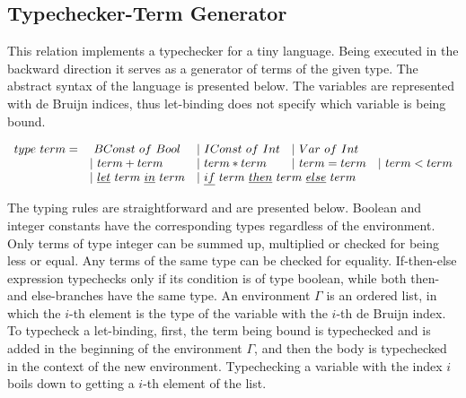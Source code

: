 
\subsection{Typechecker-Term Generator}

This relation implements a typechecker for a tiny language.
Being executed in the backward direction it serves as a generator of terms of the given type.
The abstract syntax of the language is presented below.
The variables are represented with de Bruijn indices, thus let-binding does not specify which variable is being bound.



\[\begin{array}{lllll}
  type \ term = &\ BConst \ of \ Bool &| \ IConst \ of \ Int &| \ Var \ of \ Int & \\
  & | \ term + term &| \ term * term &| \ term = term &| \ term < term \\
  &| \ \underline{let} \ term \ \underline{in} \ term
  &\multicolumn{2}{l}{| \ \underline{if} \ term \ \underline{then} \ term \ \underline{else} \ term} &
\end{array}\]

The typing rules are straightforward and are presented below.
Boolean and integer constants have the corresponding types regardless of the environment.
Only terms of type integer can be summed up, multiplied or checked for being less or equal.
Any terms of the same type can be checked for equality.
If-then-else expression typechecks only if its condition is of type boolean, while both then- and else-branches have the same type.
An environment $\Gamma$ is an ordered list, in which the $i$-th element is the type of the variable with the $i$-th de Bruijn index.
To typecheck a let-binding, first, the term being bound is typechecked and is added in the beginning of the environment $\Gamma$, and then the body is typechecked in the context of the new environment.
Typechecking a variable with the index $i$ boils down to getting a $i$-th element of the list.

